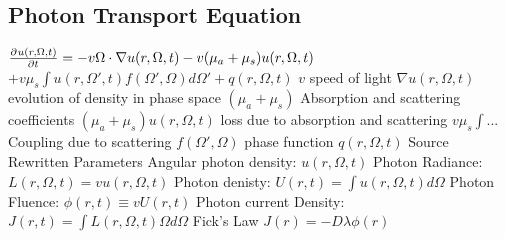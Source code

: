 \documentclass[14pt]{extarticle}
\begin{document}
\begin{outline}
\section*{Photon Transport Equation}
	\1	$\pd{u(r,\Omega,t)}{t} = -v \Omega \cdot \nabla u(r,\Omega,t)
			- v(\mu_a + \mu_s)u(r,\Omega,t)$ 
	\1	$	+ v \mu_s \int u(r,\Omega',t)f(\Omega',\Omega)d\Omega' + q(r,\Omega,t)$
		\2	$v$ speed of light
		\2	$\nabla u(r,\Omega,t)$ evolution of density in phase space
		\2	$(\mu_a + \mu_s)$ Absorption and scattering coefficients
		\2	$(\mu_a + \mu_s)u(r,\Omega,t)$ loss due to absorption and scattering
		\2  $v \mu_s \int ...$ Coupling due to scattering
		\2	$f(\Omega',\Omega)$ phase function
		\2	$q(r,\Omega,t)$ Source
	\1	Rewritten Parameters
		\2	Angular photon density: $u(r,\Omega,t)$ 
		\2	Photon Radiance: $L(r,\Omega,t) = v u(r,\Omega,t)$
		\2	Photon denisty: $U(r,t) = \int u(r,\Omega,t) d\Omega$
		\2	Photon Fluence: $\phi(r,t) \equiv v U(r,t)$
		\2	Photon current Density: $J(r,t) = \int L(r,\Omega,t) \Omega d\Omega$
	\1	Fick's Law
		\2	$J(r) = -D \lambda \phi(r)$
\end{outline}
\end{document}
